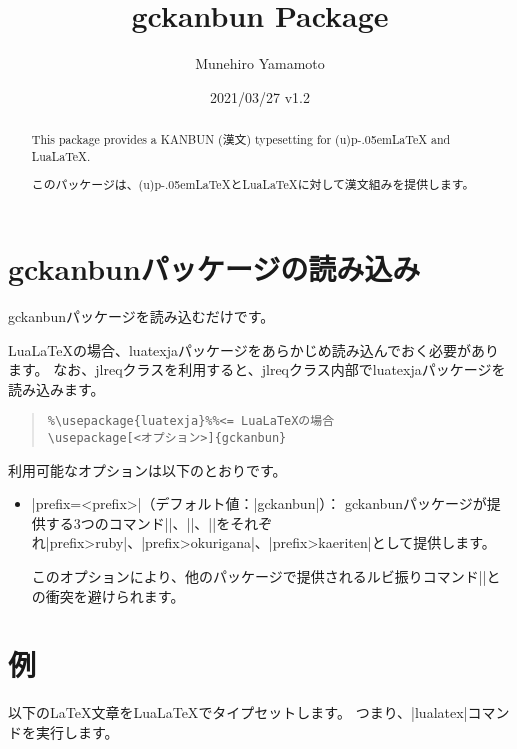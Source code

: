 \documentclass{jlreq}\listfiles
\title{\textsf{gckanbun} Package}
\author{Munehiro Yamamoto}
\date{2021/03/27 v1.2}
\newcommand*\pLaTeX{p\kern-.05em\LaTeX}
\newcommand*\LuaLaTeX{Lua\LaTeX}
\begin{document}
\maketitle

\begin{abstract}
This package provides a KANBUN (漢文) typesetting for (u){\pLaTeX} and \LuaLaTeX.

このパッケージは、(u){\pLaTeX}と{\LuaLaTeX}に対して漢文組みを提供します。
\end{abstract}

\section{\textsf{gckanbun}パッケージの読み込み}

\textsf{gckanbun}パッケージを読み込むだけです。

{\LuaLaTeX}の場合、\textsf{luatexja}パッケージをあらかじめ読み込んでおく必要があります。
なお、\textsf{jlreq}クラスを利用すると、\textsf{jlreq}クラス内部で\textsf{luatexja}パッケージを読み込みます。

\begin{quote}
\begin{verbatim}
%\usepackage{luatexja}%%<= LuaLaTeXの場合
\usepackage[<オプション>]{gckanbun}
\end{verbatim}
\end{quote}

利用可能なオプションは以下のとおりです。
\begin{itemize}
\item |prefix=<prefix>|（デフォルト値：|gckanbun|）：
\textsf{gckanbun}パッケージが提供する3つのコマンド|\gckanbunruby|、|\gckanbunokurigana|、|\gckanbunkaeriten|をそれぞれ|\<prefix>ruby|、|\<prefix>okurigana|、|\<prefix>kaeriten|として提供します。

このオプションにより、他のパッケージで提供されるルビ振りコマンド|\ruby|との衝突を避けられます。
\end{itemize}

\section{例}

以下の{\LaTeX}文章を{\LuaLaTeX}でタイプセットします。
つまり、|lualatex|コマンドを実行します。
\end{document}
